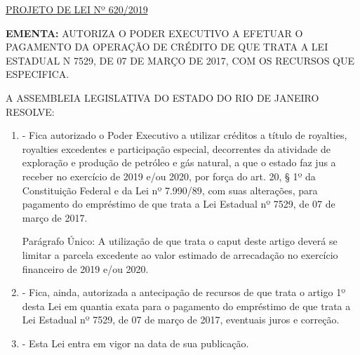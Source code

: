 \documentclass[10pt]{article}
\date{}
\begin{document}
\maketitle
\begin{center}
  \huge
  \vspace{-3cm}\href{http://alerjln1.alerj.rj.gov.br/scpro1923.nsf/f4b46b3cdbba990083256cc900746cf6/cdfbf95a3c8cfd40832584030069ae4b?OpenDocument}{PROJETO DE LEI Nº 620/2019}
\bigskip
\bigskip
\bigskip
  
\end{center}

\textbf{EMENTA:} 
AUTORIZA O PODER EXECUTIVO A EFETUAR O PAGAMENTO DA OPERAÇÃO DE CRÉDITO DE QUE TRATA A LEI ESTADUAL N 7529, DE 07 DE MARÇO DE 2017, COM OS RECURSOS QUE ESPECIFICA.









\bigskip

\noindent
A ASSEMBLEIA LEGISLATIVA DO ESTADO DO RIO DE JANEIRO RESOLVE:

\begin{enumerate}[label=Art. \arabic*\textdegree]
\item - Fica autorizado o Poder Executivo a utilizar créditos a título de royalties, royalties excedentes e participação especial, decorrentes da atividade de exploração e produção de petróleo e gás natural, a que o estado faz jus a receber no exercício de 2019 e/ou 2020, por força do art. 20, § 1º da Constituição Federal e da Lei nº 7.990/89, com suas alterações, para pagamento do empréstimo de que trata a Lei Estadual nº 7529, de 07 de março de 2017.

Parágrafo Único: A utilização de que trata o caput deste artigo deverá se limitar a parcela excedente ao valor estimado de arrecadação no exercício financeiro de 2019 e/ou 2020.


\item - Fica, ainda, autorizada a antecipação de recursos de que trata o artigo 1º desta Lei em quantia exata para o pagamento do empréstimo de que trata a Lei Estadual nº 7529, de 07 de março de 2017, eventuais juros e correção.

\item - Esta Lei entra em vigor na data de sua publicação.

\end{enumerate}
\end{document}
